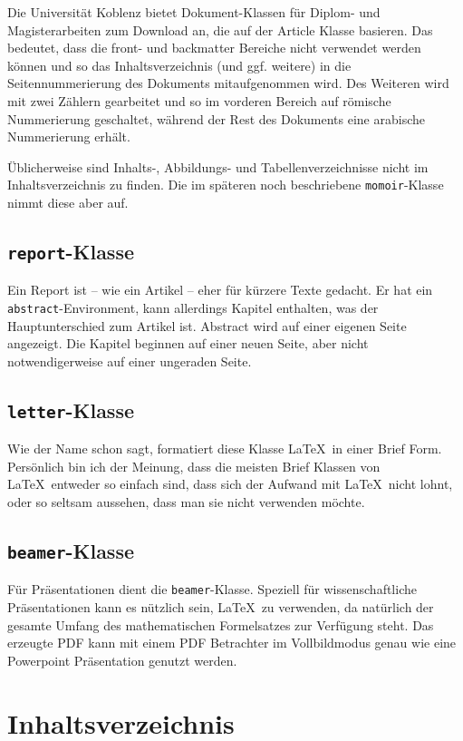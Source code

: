  Die Universität Koblenz bietet Dokument-Klassen für Diplom- und Magisterarbeiten zum Download an, die auf der Article Klasse basieren. Das bedeutet, dass die front- und backmatter Bereiche nicht verwendet werden können und so das Inhaltsverzeichnis (und ggf. weitere) in die Seitennummerierung des Dokuments mitaufgenommen wird. Des Weiteren wird mit zwei Zählern gearbeitet und so im vorderen Bereich auf römische Nummerierung geschaltet, während der Rest des Dokuments eine arabische Nummerierung erhält.

Üblicherweise sind Inhalts-, Abbildungs- und Tabellenverzeichnisse nicht im Inhaltsverzeichnis zu finden. Die im späteren noch beschriebene \texttt{momoir}-Klasse nimmt diese aber auf. 

\subsection{\texttt{report}-Klasse}

Ein Report ist -- wie ein Artikel -- eher für kürzere Texte gedacht. Er hat ein \texttt{abstract}-Environment, kann allerdings Kapitel enthalten, was der Hauptunterschied zum Artikel ist. Abstract wird auf einer eigenen Seite angezeigt. Die Kapitel beginnen auf einer neuen Seite, aber nicht notwendigerweise auf einer ungeraden Seite. 


\subsection{\texttt{letter}-Klasse}

Wie der Name schon sagt, formatiert diese Klasse \LaTeX\ in einer Brief Form. Persönlich bin ich der Meinung, dass die meisten Brief Klassen von \LaTeX\ entweder so einfach sind, dass sich der Aufwand mit \LaTeX\ nicht lohnt, oder so seltsam aussehen, dass man sie nicht verwenden möchte.

\subsection{\texttt{beamer}-Klasse}

Für Präsentationen dient die \texttt{beamer}-Klasse. Speziell für wissenschaftliche Präsentationen kann es nützlich sein, \LaTeX\ zu verwenden, da natürlich der gesamte Umfang des mathematischen Formelsatzes zur Verfügung steht. Das erzeugte PDF kann mit einem PDF Betrachter im Vollbildmodus genau wie eine Powerpoint Präsentation genutzt werden. 


\section{Inhaltsverzeichnis}\label{chap:content}

